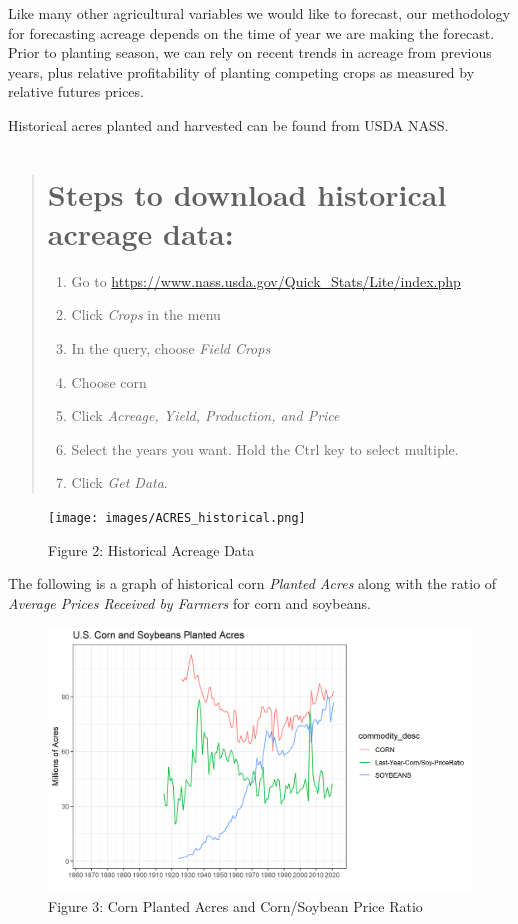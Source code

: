 \documentclass[
]{book}
\providecommand{\tightlist}{%
  \setlength{\itemsep}{0pt}\setlength{\parskip}{0pt}}
\begin{document}
Like many other agricultural variables we would like to forecast, our methodology for forecasting acreage depends on the time of year we are making the forecast. Prior to planting season, we can rely on recent trends in acreage from previous years, plus relative profitability of planting competing crops as measured by relative futures prices.

Historical acres planted and harvested can be found from USDA NASS.

\begin{quote}
\hypertarget{steps-to-download-historical-acreage-data}{%
\section{Steps to download historical acreage data:}\label{steps-to-download-historical-acreage-data}}

\begin{enumerate}
\def\labelenumi{\arabic{enumi}.}
\tightlist
\item
  Go to \url{https://www.nass.usda.gov/Quick_Stats/Lite/index.php}
\item
  Click \emph{Crops} in the menu
\item
  In the query, choose \emph{Field Crops}
\item
  Choose corn
\item
  Click \emph{Acreage, Yield, Production, and Price}
\item
  Select the years you want. Hold the Ctrl key to select multiple.
\item
  Click \emph{Get Data}.
\end{enumerate}
\end{quote}

\begin{figure}
\centering
\texttt{[image: images/ACRES\_historical.png]}
\caption{Figure 2: Historical Acreage Data}
\end{figure}

The following is a graph of historical corn \emph{Planted Acres} along with the ratio of \emph{Average Prices Received by Farmers} for corn and soybeans.

\begin{figure}
\centering
\includegraphics{assets/ForecastingProduction-PlantedAcres.png}
\caption{Figure 3: Corn Planted Acres and Corn/Soybean Price Ratio}
\end{figure}
\end{document}
